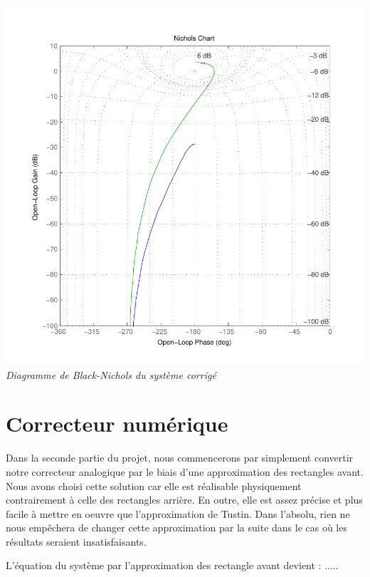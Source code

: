 \documentclass[11pt, french]{article} %
\begin{document}
\begin{center}
\includegraphics[scale=0.50]{MatBlack.pdf}
\\
\emph{Diagramme de Black-Nichols du système corrigé}
\end{center}

\section{Correcteur numérique}

Dans la seconde partie du projet, nous commencerons par simplement convertir notre correcteur analogique par le biais d'une approximation des rectangles avant. Nous avons choisi cette solution car elle est réalisable physiquement contrairement à celle des rectangles arrière. En outre, elle est assez précise et plus facile à mettre en oeuvre que l'approximation de Tustin. Dans l'absolu, rien ne nous empêchera de changer cette approximation par la suite dans le cas où les résultats seraient insatisfaisants. 

L'équation du système par l'approximation des rectangle avant devient :
.....
\end{document}

